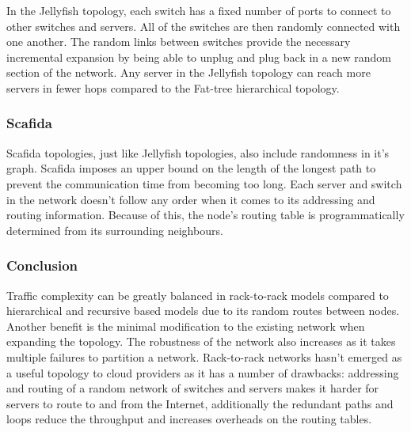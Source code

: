\documentclass[12pt]{article}
\begin{document}
In the Jellyfish topology, each switch has a fixed number of ports to connect to other switches and servers. All of the switches are then randomly connected with one another. The random links between switches provide the necessary incremental expansion by being able to unplug and plug back in a new random section of the network. Any server in the Jellyfish topology can reach more servers in fewer hops compared to the Fat-tree hierarchical topology.


\subsubsection{Scafida} \label{subp:scafida}

Scafida topologies, just like Jellyfish topologies, also include randomness in it's graph. Scafida imposes an upper bound on the length of the longest path to prevent the communication time from becoming too long. Each server and switch in the network doesn't follow any order when it comes to its addressing and routing information. Because of this, the node's routing table is programmatically determined from its surrounding neighbours.



\subsubsection{Conclusion} \label{ssub:rack-concl}


Traffic complexity can be greatly balanced in rack-to-rack models compared to hierarchical and recursive based models due to its random routes between nodes. Another benefit is the minimal modification to the existing network when expanding the topology. The robustness of the network also increases as it takes multiple failures to partition a network. Rack-to-rack networks hasn't emerged as a useful topology to cloud providers as it has a number of drawbacks: addressing and routing of a random network of switches and servers makes it harder for servers to route to and from the Internet, additionally the redundant paths and loops reduce the throughput and increases overheads on the routing tables.



\end{document}
